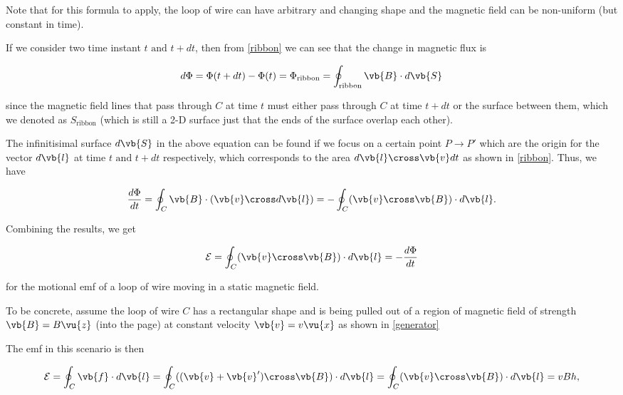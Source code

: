 \documentclass[english,a4paper,12pt]{report}
\begin{document}
Note that for this formula to apply, the loop of wire can have arbitrary and changing shape and the magnetic field can be non-uniform (but constant in time). 

If we consider two time instant \(t \text { and } t+dt\), then from \cref{ribbon} we can see that the change in magnetic flux is


\begin{equation}
    d\Phi = \Phi (t+dt) - \Phi (t) = \Phi _{\text{ribbon}} = \oint_{\text{ribbon} } \vb{B} \cdot d \vb{S} 
\end{equation}

since the magnetic field lines that pass through \(C\) at time \(t\) must either pass through \(C\) at time \(t+dt\) or the surface between them, which we denoted as \(S _{\text{ribbon} } \) (which is still a 2-D surface just that the ends of the surface overlap each other). 

The infinitisimal surface \(d \vb{S} \) in the above equation can be found if we focus on a certain point \(P \rightarrow P'\) which are the origin for the vector \(d \vb{l} \) at time \(t \text { and }  t+dt\) respectively, which corresponds to the area \(d \vb{l} \cross \vb{v} dt\) as shown in \cref{ribbon}. Thus, we have

\begin{equation}
    \frac{d\Phi }{dt} = \oint_{C} \vb{B} \cdot (\vb{v} \cross d \vb{l} ) = -\oint_{C} (\vb{v} \cross \vb{B} ) \cdot d \vb{l}.    
\end{equation}

Combining the results, we get 

\begin{equation} \label{motionalemf} 
    \mathcal{E} = \oint_{C} (\vb{v} \cross \vb{B} )\cdot d \vb{l} = -\frac{d\Phi }{dt}
\end{equation}

for the motional emf of a loop of wire moving in a static magnetic field.

To be concrete, assume the loop of wire \(C\)  has a rectangular shape and is being pulled out of a region of magnetic field of strength \(\vb{B} = B \vu{z}  \) (into the page) at constant velocity \(\vb{v} = v \vu{x} \)  as shown in \cref{generator}  


The emf in this scenario is then 

\begin{equation}
    \mathcal{E} = \oint_{C} \vb{f}  \cdot d \vb{l} = \oint_{C} ((\vb{v} + \vb{v} ') \cross \vb{B} ) \cdot  d\vb{l}  = \oint_{C}(\vb{v} \cross \vb{B} )\cdot d \vb{l} =  vBh ,
\end{equation}
\end{document}

